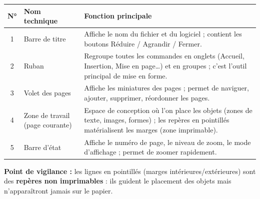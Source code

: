 \documentclass[11pt]{article}
\begin{document}
\begin{corrige}
\begin{center}
\begin{tabularx}{\linewidth}{|c|l|X|}
\hline
\rowcolor{popblueL} \textbf{N°} & \textbf{Nom technique} & \textbf{Fonction principale} \\ \hline
1 & Barre de titre & Affiche le nom du fichier et du logiciel ; contient les boutons Réduire / Agrandir / Fermer. \\ \hline
2 & Ruban & Regroupe toutes les commandes en onglets (Accueil, Insertion, Mise en page\ldots) et en groupes ; c'est l'outil principal de mise en forme. \\ \hline
3 & Volet des pages & Affiche les miniatures des pages ; permet de naviguer, ajouter, supprimer, réordonner les pages. \\ \hline
4 & Zone de travail (page courante) & Espace de conception où l'on place les objets (zones de texte, images, formes) ; les repères en pointillés matérialisent les marges (zone imprimable). \\ \hline
5 & Barre d'état & Affiche le numéro de page, le niveau de zoom, le mode d'affichage ; permet de zoomer rapidement. \\ \hline
\end{tabularx}
\end{center}

\textbf{Point de vigilance :} les lignes en pointillés (marges intérieures/extérieures) sont des \textbf{repères non imprimables} : ils guident le placement des objets mais n'apparaîtront jamais sur le papier.
\end{corrige}
\end{document}
